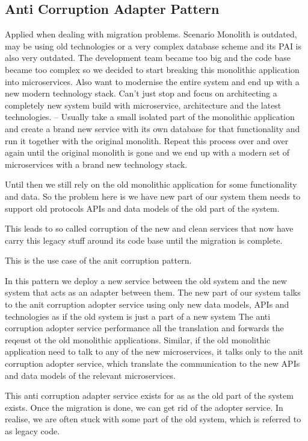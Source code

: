 \subsection{Anti Corruption Adapter Pattern}
Applied when dealing with migration problems.
Scenario
Monolith is outdated, may be using old technologies or a very complex database scheme and its PAI is also very outdated.
The development team became too big and the code base became too complex so we decided to start breaking this monolithic application into microservices.
Also want to modernise the entire system and end up with a new modern technology stack.
Can't just stop and focus on architecting a completely new system build with microservice, architecture and the latest technologies.
-- Usually take a small isolated part of the monolithic application and create a brand new service with its own database for that functionality and run it together with the original monolith.
Repeat this process over and over again until the original monolith is gone and we end up with a modern set of microservices with a brand new technology stack.

Until then we still rely on the old monolithic application for some functionality and data.
So the problem here is we have new part of our system them needs to support old protocols APIs and data models of the old part of the system.

This leads to so called corruption of the new and clean services that now have carry this legacy stuff around its code base until the migration is complete.

This is the use case of the anit corruption pattern.

In this pattern we deploy a new service between the old system and the new system that acts as an adapter between them.
The new part of our system talks to the anit corruption adopter service using only new data models, APIs and technologies as if the old system is just a part of a new system
The anti corruption adopter service performance all the translation and forwards the reqeust ot the old monolithic applications.
Similar, if the old monolithic application need to talk to any of the new microservices, it talks only to the anit corruption adopter service, which translate the communication to the new APIs and data models of the relevant microservices.

This anti corruption adapter service exists for as as the old part of the system exists.
Once the migration is done, we can get rid of the adopter service.
In realise, we are often stuck with some part of the old system, which is referred to as legacy code.

